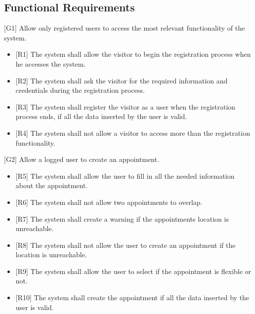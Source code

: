 \documentclass[12pt]{article}
\begin{document}
\subsection{Functional Requirements}

{[G1]} Allow only registered users to access the most relevant functionality of the system.
\begin{itemize}
    \item{[R1]} The system shall allow the visitor to begin the registration process when he accesses the system. 
    \item{[R2]} The system shall ask the visitor for the required information and credentials during the registration process.
    \item{[R3]} The system shall register the visitor as a user when the registration process ends, if all the data inserted by the user is valid.
    \item{[R4]} The system shall not allow a visitor to access more than the registration functionality.
\end{itemize}
{[G2]} Allow a logged user to create an appointment.
\begin{itemize}
    \item{[R5]} The system shall allow the user to fill in all the needed information about the appointment.
    \item{[R6]} The system shall not allow two appointments to overlap.
    \item{[R7]} The system shall create a warning if the appointments location is unreachable.
    \item{[R8]} The system shall not allow the user to create an appointment if the location is unreachable.
    \item{[R9]} The system shall allow the user to select if the appointment is flexible or not.
    \item{[R10]} The system shall create the appointment if all the data inserted by the user is valid.
\end{itemize}
\end{document}
